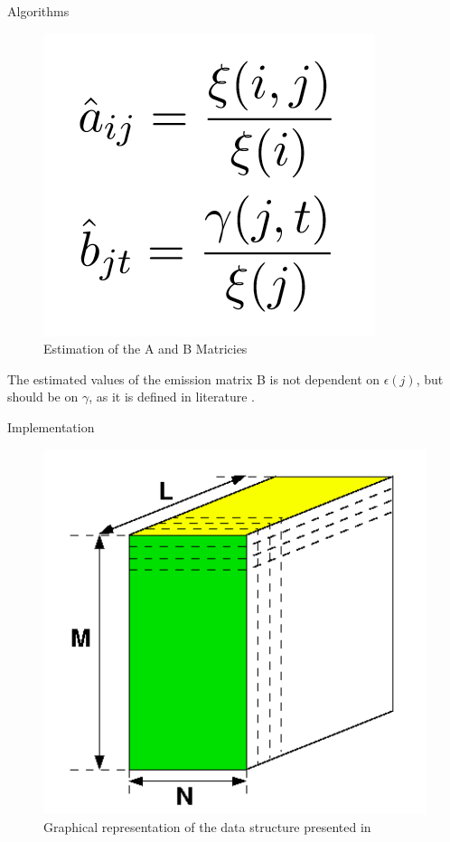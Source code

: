 \documentclass[11pt]{beamer}
\begin{document}
\begin{frame}{Algorithms}
\begin{figure}[H]

\centering
\includegraphics[scale=0.4]{"estimation"}
 \caption{Estimation of the A and B Matricies \cite{cuhmm}}
\end{figure}

The estimated values of the emission matrix B is not dependent on \(\epsilon(j)\), but should be on \(\gamma\), as it is defined in literature \cite{hmm}. 
\end{frame}

\begin{frame}{Implementation}
\begin{figure}[H]
\centering

\includegraphics[scale=0.2]{"3d_trellis"}
  \caption{Graphical representation of the data structure presented in }
\end{figure}
\end{frame}
\end{document}
